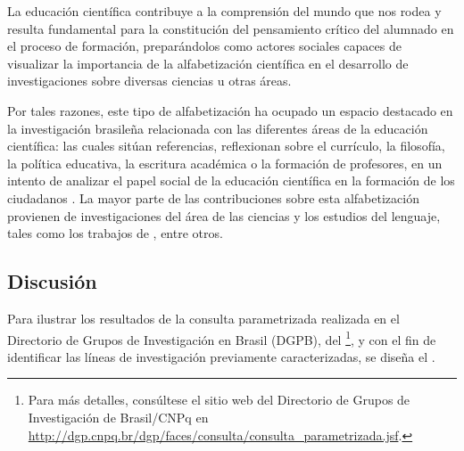 \documentclass{textolivre}
\begin{document}
La educación científica contribuye a la comprensión del mundo que nos rodea y resulta fundamental para la constitución del pensamiento crítico del alumnado en el proceso de formación, preparándolos como actores sociales capaces de visualizar la importancia de la alfabetización científica en el desarrollo de investigaciones sobre diversas ciencias u otras áreas.   

Por tales razones, este tipo de alfabetización ha ocupado un espacio destacado en la investigación brasileña relacionada con las diferentes áreas de la educación científica: las cuales sitúan referencias, reflexionan sobre el currículo, la filosofía, la política educativa, la escritura académica o la formación de profesores, en un intento de analizar el papel social de la educación científica en la formación de los ciudadanos \cite{santos_educacao_2007}. La mayor parte de las contribuciones sobre esta alfabetización provienen de investigaciones del área de las ciencias y los estudios del lenguaje, tales como los trabajos de \textcite{santos_educacao_2007, motta-roth_letramento_2011, cunha_alfabetizacao_2017, silva_ciencia_2018}, entre otros.

\subsection{Discusión}\label{sec-discusion}
Para ilustrar los resultados de la consulta parametrizada realizada en el Directorio de Grupos de Investigación en Brasil (DGPB), del \textcite{consejo_nacional_de_desarrollo_cientifico_y_tecnologico__cnpq_directorio_nodate}\footnote{Para más detalles, consúltese el sitio web del Directorio de Grupos de Investigación de Brasil/CNPq en \url{http://dgp.cnpq.br/dgp/faces/consulta/consulta_parametrizada.jsf}.}, y con el fin de identificar las líneas de investigación previamente caracterizadas, se diseña el .
\end{document}
